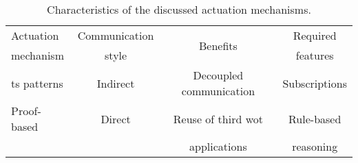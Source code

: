 
\begin{table}[htbp]
  \caption{Characteristics of the discussed actuation mechanisms.}
  \begin{center}
    \footnotesize
    \begin{tabular}{lccc}
      \hline
      Actuation &
      Communication & %
      \multirow{2}{*}{Benefits} &
      Required \\
      mechanism &
      style &
      ~ &
      features \\
      \hline
      \ac{ts} patterns & Indirect & Decoupled communication & Subscriptions \\
      Proof-based & Direct & Reuse of third \ac{wot} & Rule-based \\ %
      & & applications & reasoning \\ %
      \hline
    \end{tabular}
  \end{center}
  \label{tab:network_properties}
\end{table}